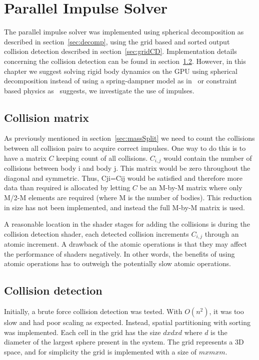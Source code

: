 \chapter{Parallel Impulse Solver}\label{cha:impl}
The parallel impulse solver was implemented using spherical decomposition as
 described in section~\ref{sec:decomp}, using the grid based and sorted output
 collision detection described in section~\ref{sec:gridCD}. Implementation details
 concerning the collision detection can be found in section~\ref{sec:implcd}.
However, in this chapter we suggest solving rigid body dynamics on the GPU using spherical
decomposition instead of using a spring-dampner model as in~\cite{gpugems} or constraint
based physics as~\cite{flex} suggests, we investigate the use of impulses.


\section{Collision matrix}\label{sec:colMatrix}
As previously mentioned in section~\ref{sec:massSplit} we need to count the collisions
between all collision pairs to acquire correct impulses. One way to do
this is to have a matrix $C$ keeping count of all collisions. $C_{i,j}$ would
contain the number of collisions between body i and body j. This matrix would be
zero throughout the diagonal and symmetric. Thus, Cji=Cij would be satisfied and
therefore more data than required is allocated by letting $C$
be an M-by-M matrix where only M/2-M elements are required (where M is the
number of bodies). This reduction in size
has not been implemented, and instead the full M-by-M matrix is used.

A reasonable location in the shader stages for adding the collisions is during
the collision detection shader, each detected collision increments $C_{i,j}$
 through an atomic increment. A drawback of the atomic
 operations is that they may affect the performance of shaders negatively. In
 other words, the benefits of using atomic operations has to outweigh the potentially
 slow atomic operations.

\section{Collision detection}\label{sec:implcd}
Initially, a brute force collision detection was tested. With $O(n^2)$, it was too
slow and had poor scaling as expected. Instead, spatial partitioning with sorting
was implemented.
Each cell in the grid has the size $d x d x d$ where $d$ is the diameter of the largest sphere
present in the system. The grid represents a 3D space, and for simplicity the grid is
implemented with a size of $mxmxm$.

